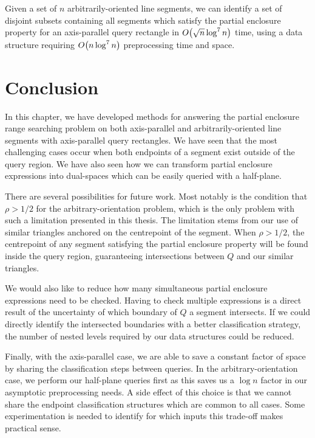 \begin{theorem}
\label{th:ao}
Given a set of $n$ arbitrarily-oriented line segments, we can identify a set of disjoint subsets containing all segments which satisfy the partial enclosure property for an axis-parallel query rectangle in $O\!\left(\sqrt{n}\log^7{n}\right)$ time, using a data structure requiring $O\!\left(n\log^7{n}\right)$ preprocessing time and space.
\end{theorem}


\section{Conclusion}
\label{:rectangles:concl}

In this chapter, we have developed methods for answering the partial enclosure range searching problem on both axis-parallel and arbitrarily-oriented line segments with axis-parallel query rectangles. 
We have seen that the most challenging cases occur when both endpoints of a segment exist outside of the query region.
We have also seen how we can transform partial enclosure expressions into dual-spaces which can be easily queried with a half-plane.

There are several possibilities for future work.
Most notably is the condition that $\rho > 1/2$ for the arbitrary-orientation problem, which is the only problem with such a limitation presented in this thesis.
The limitation stems from our use of similar triangles anchored on the centrepoint of the segment.
When $\rho > 1/2$, the centrepoint of any segment satisfying the partial enclosure property will be found inside the query region, guaranteeing intersections between $Q$ and our similar triangles.

We would also like to reduce how many simultaneous partial enclosure expressions need to be checked. Having to check multiple expressions is a direct result of the uncertainty of which boundary of $Q$ a segment intersects. If we could directly identify the intersected boundaries with a better classification strategy, the number of nested levels required by our data structures could be reduced.

Finally, with the axis-parallel case, we are able to save a constant factor of space by sharing the classification steps between queries. 
In the arbitrary-orientation case, we perform our half-plane queries first as this saves us a $\log{n}$ factor in our asymptotic preprocessing needs. A side effect of this choice is that we cannot share the endpoint classification structures which are common to all cases.  
Some experimentation is needed to identify for which inputs this trade-off makes practical sense.
